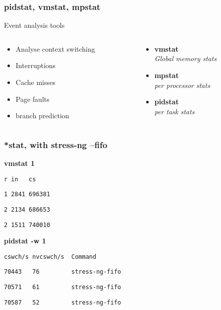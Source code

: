 \begin{frame}
	\frametitle{pidstat, vmstat, mpstat}
Event analysis tools
\begin{columns}
	\begin{column}[t]{0.55\linewidth}
	\begin{itemize}
		\item Analyse context switching
		\item Interruptions
		\item Cache misses
		\item Page faults
		\item branch prediction
	\end{itemize}
\end{column}
\begin{column}[t]{0.45\linewidth}
	\begin{itemize}
		\item \textbf{vmstat} \\ {\small{\textit{Global memory stats}}}
		\item \textbf{mpstat} \\ {\small{\textit{per processor stats}}}
		\item \textbf{pidstat}\\ {\small{\textit{per task stats}}}
	\end{itemize}
\end{column}
\end{columns}
\end{frame}

\begin{frame}[fragile]
	\frametitle{*stat, with stress-ng --fifo}
\textbf{vmstat 1}

\verb+r in   cs+

\verb+1 2841 696381 +

\verb+2 2134 686653 +

\verb+2 1511 740010 +

			\vspace{1cm}
\textbf{pidstat -w 1}

\verb+cswch/s nvcswch/s  Command +

\verb+70443   76         stress-ng-fifo +

\verb+70571   61         stress-ng-fifo +

\verb+70587   52         stress-ng-fifo +

\end{frame}

